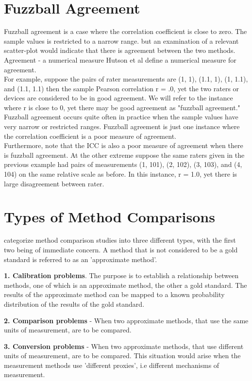 \documentclass[12pt, a4paper]{article}
\begin{document}
\section{Fuzzball Agreement}
Fuzzball agreement is a case where the correlation coefficient is close to zero. The sample values is restricted to a narrow range. but an examination of a relevant scatter-plot would indicate that
there is agreement between the two methods.
\\
Agreement - a numerical measure Hutson et al define a numerical measure for agreement.
\\
For example, suppose the pairs of rater measurements are (1, 1), (1.1, 1), (1, 1.1), and (1.1, 1.1) then the sample Pearson correlation r = .0, yet the two raters or devices are considered to be in good agreement. We will refer to the instance where r is close to 0, yet there may be good agreement as "fuzzball agreement." \\Fuzzball agreement occurs quite often in practice when the sample values have very narrow or restricted ranges. Fuzzball agreement is just one instance where the correlation coefficient is a poor measure of agreement. \\Furthermore, note that the ICC is also a poor measure of agreement when there is fuzzball agreement. At the other extreme suppose the same raters given in the previous example had pairs of measurements (1, 101), (2, 102), (3, 103), and (4, 104) on the same relative scale as before. In this instance, r = 1.0, yet there is large disagreement between rater.

\section{Types of Method Comparisons} \citet{Lewis} categorize
method comparison studies into three different types, with the
first two being of immediate concern. A method that is not considered to be a gold standard is referred
to as an 'approximate method'.

\textbf{1. Calibration problems}. The purpose is to establish a
relationship between methods, one of which is an approximate
method, the other a gold standard. The results of the approximate
method can be mapped to a known probability distribution of the
results of the gold standard.

\smallskip
\textbf{2. Comparison problems} - When two approximate methods,
that use the same units of measurement, are to be compared.

\smallskip
\textbf{3. Conversion problems} -  When two approximate methods,
that use different units of measurement, are to be compared. This
situation would arise when the measurement methods use 'different
proxies', i.e different mechanisms of measurement.
\end{document}
